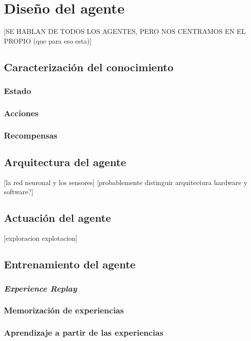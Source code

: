 \chapter{Diseño del agente}

[SE HABLAN DE TODOS LOS AGENTES, PERO NOS CENTRAMOS EN EL PROPIO (que para eso esta)]

\section{Caracterización del conocimiento}

\subsection{Estado}

\subsection{Acciones}

\subsection{Recompensas}
 
\section{Arquitectura del agente}
[la red neuronal y los sensores]
[probablemente distinguir arquitectura hardware y software?]

\section{Actuación del agente}
[exploracion explotacion]

\section{Entrenamiento del agente}

\subsection{\textit{Experience Replay}}

\subsection{Memorización de experiencias}

\subsection{Aprendizaje a partir de las experiencias}

